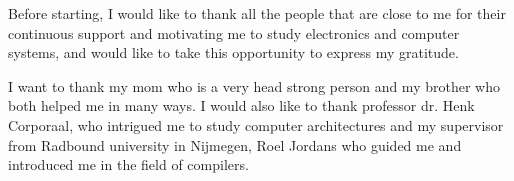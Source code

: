 Before starting, I would like to thank all the people that are close to me for their continuous support and motivating me to study electronics and computer systems, and would like to take this opportunity to express my gratitude.

I want to thank my mom who is a very head strong person and my brother who both helped me in many ways. I would also like to thank professor dr. Henk Corporaal, who intrigued me to study computer architectures and my supervisor from Radbound university in Nijmegen, Roel Jordans who guided me and introduced me in the field of compilers.



